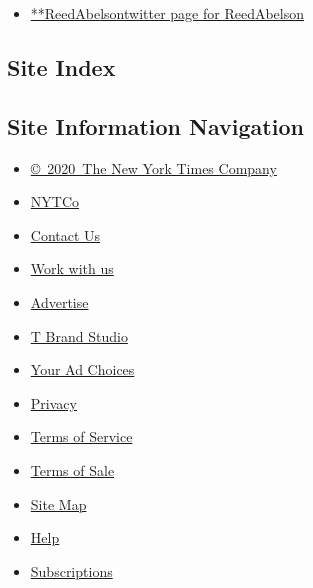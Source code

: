 \begin{itemize}
\tightlist
\item
  \href{https://twitter.com/ReedAbelson}{**ReedAbelsontwitter page for
  ReedAbelson}
\end{itemize}

\hypertarget{site-index}{%
\subsection{Site Index}\label{site-index}}

\hypertarget{site-information-navigation}{%
\subsection{Site Information
Navigation}\label{site-information-navigation}}

\begin{itemize}
\tightlist
\item
  \href{https://help.nytimes3xbfgragh.onion/hc/en-us/articles/115014792127-Copyright-notice}{©~2020~The
  New York Times Company}
\end{itemize}

\begin{itemize}
\tightlist
\item
  \href{https://www.nytco.com/}{NYTCo}
\item
  \href{https://help.nytimes3xbfgragh.onion/hc/en-us/articles/115015385887-Contact-Us}{Contact
  Us}
\item
  \href{https://www.nytco.com/careers/}{Work with us}
\item
  \href{https://nytmediakit.com/}{Advertise}
\item
  \href{http://www.tbrandstudio.com/}{T Brand Studio}
\item
  \href{https://www.nytimes3xbfgragh.onion/privacy/cookie-policy\#how-do-i-manage-trackers}{Your
  Ad Choices}
\item
  \href{https://www.nytimes3xbfgragh.onion/privacy}{Privacy}
\item
  \href{https://help.nytimes3xbfgragh.onion/hc/en-us/articles/115014893428-Terms-of-service}{Terms
  of Service}
\item
  \href{https://help.nytimes3xbfgragh.onion/hc/en-us/articles/115014893968-Terms-of-sale}{Terms
  of Sale}
\item
  \href{https://spiderbites.nytimes3xbfgragh.onion}{Site Map}
\item
  \href{https://help.nytimes3xbfgragh.onion/hc/en-us}{Help}
\item
  \href{https://www.nytimes3xbfgragh.onion/subscription?campaignId=37WXW}{Subscriptions}
\end{itemize}
